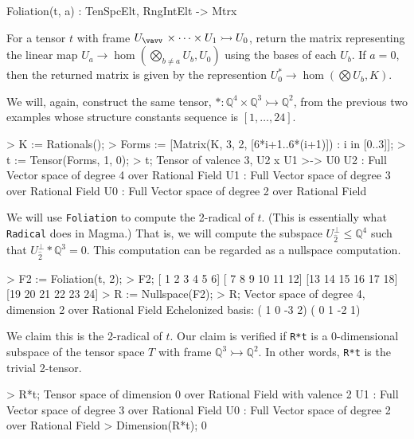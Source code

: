\begin{intrinsics}
Foliation(t, a) : TenSpcElt, RngIntElt -> Mtrx
\end{intrinsics}

For a tensor $t$ with frame $U_{\vav}\times\cdots\times U_1\rightarrowtail U_0$,
return the matrix representing the linear map 
$U_a\rightarrow \hom(\bigotimes_{b\ne a}U_b,U_0)$ using the bases of each $U_b$.
If $a=0$, then the returned matrix is given by the represention 
$U_0^*\rightarrow \hom(\bigotimes U_b,K)$.

\begin{example}[ExfoliateFoliation]

We will, again, construct the same tensor, $*:\mathbb{Q}^4\times\mathbb{Q}^3\rightarrowtail \mathbb{Q}^2$, from the previous two examples whose structure constants sequence is $[1,\dots,24]$.
\begin{code}
> K := Rationals();
> Forms := [Matrix(K, 3, 2, [6*i+1..6*(i+1)]) : i in [0..3]];
> t := Tensor(Forms, 1, 0);
> t;
Tensor of valence 3, U2 x U1 >-> U0
U2 : Full Vector space of degree 4 over Rational Field
U1 : Full Vector space of degree 3 over Rational Field
U0 : Full Vector space of degree 2 over Rational Field
\end{code}

We will use \texttt{Foliation} to compute the 2-radical of $t$. 
(This is essentially what \texttt{Radical} does in Magma.)
That is, we will compute the subspace $U_{\hat{2}}^\perp\leq \mathbb{Q}^4$ such that $U_{\hat{2}}^\perp*\mathbb{Q}^3=0$. 
This computation can be regarded as a nullspace computation.
\begin{code}
> F2 := Foliation(t, 2);
> F2;
[ 1  2  3  4  5  6]
[ 7  8  9 10 11 12]
[13 14 15 16 17 18]
[19 20 21 22 23 24]
> R := Nullspace(F2);
> R;
Vector space of degree 4, dimension 2 over Rational Field
Echelonized basis:
( 1  0 -3  2)
( 0  1 -2  1)
\end{code}

We claim this is the 2-radical of $t$. 
Our claim is verified if \texttt{R*t} is a 0-dimensional subspace of the tensor space $T$ with frame $\mathbb{Q}^3\rightarrowtail\mathbb{Q}^2$.
In other words, \texttt{R*t} is the trivial 2-tensor.
\begin{code}
> R*t;
Tensor space of dimension 0 over Rational Field with valence 2
U1 : Full Vector space of degree 3 over Rational Field
U0 : Full Vector space of degree 2 over Rational Field
> Dimension(R*t);
0
\end{code}
\end{example}


